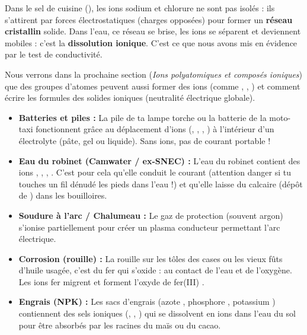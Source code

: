 \documentclass[11pt]{article}
\newcounter{popsec}
\newcounter{popsub}
\newcommand{\courssub}[1]{%
  \stepcounter{popsub}%
  \par\vspace{9pt}\noindent{\popxbold\fontsize{11.5}{13}\selectfont\color{popink}{\color{poporange}\thepopsec.\thepopsub}\hspace{6pt}#1}\par\nopagebreak\vspace{4pt}
}
\begin{document}
\courssub{Vers les composés ioniques}

Dans le sel de cuisine (), les ions sodium  et chlorure  ne sont pas isolés : ils s'attirent par forces électrostatiques (charges opposées) pour former un \textbf{réseau cristallin} solide. Dans l'eau, ce réseau se brise, les ions se séparent et deviennent mobiles : c'est la \textbf{dissolution ionique}. C'est ce que nous avons mis en évidence par le test de conductivité.

Nous verrons dans la prochaine section (\textit{Ions polyatomiques et composés ioniques}) que des groupes d'atomes peuvent aussi former des ions (comme , , ) et comment écrire les formules des solides ioniques (neutralité électrique globale).

\begin{savaistu}
\begin{itemize}
    \item \textbf{Batteries et piles :} La pile de ta lampe torche ou la batterie de la moto-taxi fonctionnent grâce au déplacement d'ions (, , , ) à l'intérieur d'un électrolyte (pâte, gel ou liquide). Sans ions, pas de courant portable !
    \item \textbf{Eau du robinet (Camwater / ex-SNEC) :} L'eau du robinet contient des ions , , , . C'est pour cela qu'elle conduit le courant (attention danger si tu touches un fil dénudé les pieds dans l'eau !) et qu'elle laisse du calcaire (dépôt de ) dans les bouilloires.
    \item \textbf{Soudure à l'arc / Chalumeau :} Le gaz de protection (souvent  argon) s'ionise partiellement pour créer un plasma conducteur permettant l'arc électrique.
    \item \textbf{Corrosion (rouille) :} La rouille sur les tôles des cases ou les vieux fûts d'huile usagée, c'est du fer qui s'oxide :  au contact de l'eau et de l'oxygène. Les ions fer migrent et forment l'oxyde de fer(III) .
    \item \textbf{Engrais (NPK) :} Les sacs d'engrais (azote , phosphore , potassium ) contiennent des sels ioniques (, , ) qui se dissolvent en ions dans l'eau du sol pour être absorbés par les racines du maïs ou du cacao.
\end{itemize}
\end{savaistu}
\end{document}
